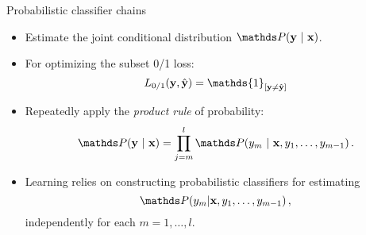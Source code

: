 \documentclass[11pt,compress,t,notes=noshow, xcolor=table]{beamer}
\begin{document}

\begin{frame}{Probabilistic classifier chains}
	
	\begin{itemize}
		\item Estimate the \alert{joint} conditional distribution $\P(\yv ~|~  \xv)$. 
		\item For optimizing the \alert{subset 0/1} loss:  $$ L_{0/1}(\yv, \hat{\yv}) = \mathds{1}_{[\yv \ne \hat{\yv}]}$$
		\item Repeatedly apply the \emph{product rule} of probability:
		$$
		\P(\yv ~|~ \xv) = \prod_{j=m}^{l} \P(y_m ~|~ \xv, y_1, \ldots,y_{m-1}) \, .
		$$
		\item  Learning relies on constructing \alert{probabilistic classifiers} for estimating 
		$$
		\P( y_m|\xv, y_1, \ldots,y_{m-1}) \,,
		$$
		{independently} for each $m = 1, \ldots, l$. 
	\end{itemize}
\end{frame}
\end{document}
